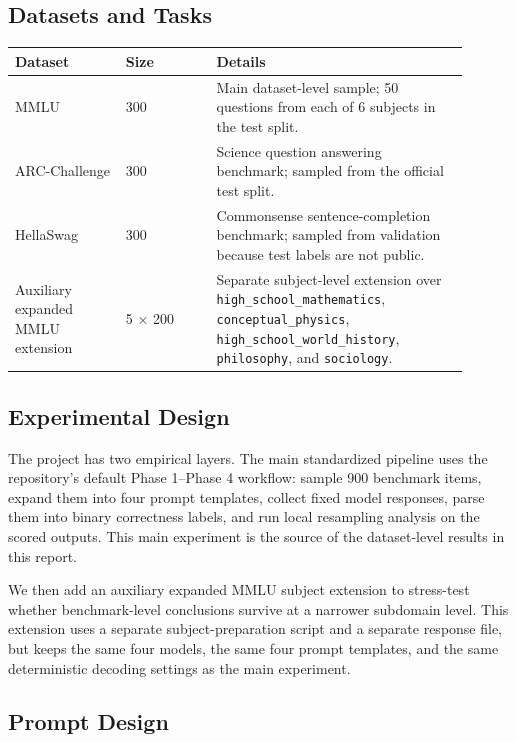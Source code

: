 \documentclass[11pt]{article}
\begin{document}
\subsection{Datasets and Tasks}

\begin{center}
\begin{tabular}{@{}p{0.22\linewidth} p{0.18\linewidth} p{0.50\linewidth}@{}}
\toprule
\textbf{Dataset} & \textbf{Size} & \textbf{Details} \\
\midrule
MMLU & 300 & Main dataset-level sample; 50 questions from each of 6 subjects in the test split. \\
ARC-Challenge & 300 & Science question answering benchmark; sampled from the official test split. \\
HellaSwag & 300 & Commonsense sentence-completion benchmark; sampled from validation because test labels are not public. \\
Auxiliary expanded MMLU extension & 5 $\times$ 200 & Separate subject-level extension over \texttt{high\_school\_mathematics}, \texttt{conceptual\_physics}, \texttt{high\_school\_world\_history}, \texttt{philosophy}, and \texttt{sociology}. \\
\bottomrule
\end{tabular}
\end{center}

\subsection{Experimental Design}

The project has two empirical layers. The main standardized pipeline uses the repository's default Phase 1--Phase 4 workflow: sample 900 benchmark items, expand them into four prompt templates, collect fixed model responses, parse them into binary correctness labels, and run local resampling analysis on the scored outputs. This main experiment is the source of the dataset-level results in this report.

We then add an auxiliary expanded MMLU subject extension to stress-test whether benchmark-level conclusions survive at a narrower subdomain level. This extension uses a separate subject-preparation script and a separate response file, but keeps the same four models, the same four prompt templates, and the same deterministic decoding settings as the main experiment.

\subsection{Prompt Design}
\end{document}

